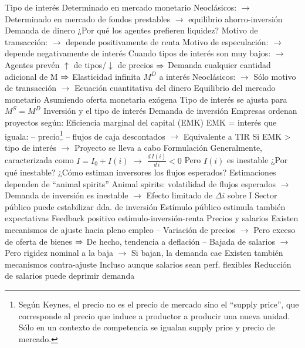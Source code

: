 \documentclass{nuevotema}
\begin{document}
\begin{esquemal}
				\4 Tipo de interés
				\4[] Determinado en mercado monetario
				\4[] Neoclásicos:
				\4[] $\to$ Determinado en mercado de fondos prestables
				\4[] $\to$ equilibrio ahorro-inversión
				\4 Demanda de dinero
				\4[] ¿Por qué los agentes prefieren liquidez?
				\4[] Motivo de transacción:
				\4[] $\to$ depende positivamente de renta
				\4[] Motivo de especulación:
				\4[] $\to$ depende negativamente de interés
				\4[] Cuando tipos de interés son muy bajos:
				\4[] $\to$ Agentes prevén $\uparrow$ de tipos/$\downarrow$ de precios
				\4[] $\then$ Demanda cualquier cantidad adicional de M
				\4[] $\then$ Elasticidad infinita $M^D$ a interés
				\4[] Neoclásicos:
				\4[] $\to$ Sólo motivo de transacción
				\4[] $\to$ Ecuación cuantitativa del dinero
				\4 Equilibrio del mercado monetario
				\4[] Asumiendo oferta monetaria exógena
				\4[] Tipo de interés se ajusta para $M^S = M^D$
			\3 Inversión y el tipo de interés
				\4 Demanda de inversión
				\4[] Empresas ordenan proyectos según:
				\4[] Eficiencia marginal del capital (EMK)
				\4[] EMK = interés que iguala:
				\4[] -- precio\footnote{Según Keynes, el precio no es el precio de mercado sino el ``supply price'', que corresponde al precio que induce a productor a producir una nueva unidad. Sólo en un contexto de competencia se igualan supply price y precio de mercado.}
				\4[] -- flujos de caja descontados
				\4[] $\to$ Equivalente a TIR
				\4[] Si EMK > tipo de interés
				\4[] $\to$ Proyecto se lleva a cabo
				\4 Formulación
				\4[] Generalmente, caracterizada como $I = I_0 + I(i)$
				\4[] $\to$ $\frac{d \, I(i)}{d \, i} < 0$
				\4[] Pero $I(i)$ es inestable
				\4 ¿Por qué inestable?
				\4[] ¿Cómo estiman inversores los flujos esperados?
				\4[] Estimaciones dependen de ``animal spirits''
				\4[] Animal spirits: volatilidad de flujos esperados
				\4[] $\to$ Demanda de inversión es inestable
				\4[] $\to$ Efecto limitado de $\Delta i$ sobre I
				\4[$\then$] Sector público puede estabilizar dda. de inversión
				\4[$\then$] Estímulo público estimula también expectativas
				\4[$\then$] Feedback positivo estímulo-inversión-renta
			\3 Precios y salarios
				\4 Existen mecanismos de ajuste hacia pleno empleo
				\4[] -- Variación de precios
				\4[] $\to$ Pero exceso de oferta de bienes
				\4[] $\then$ De hecho, tendencia a deflación
				\4[] -- Bajada de salarios
				\4[] $\to$ Pero rigidez nominal a la baja
				\4[] $\to$ Si bajan, la demanda cae
				\4 Existen también mecanismos contra-ajuste
				\4[] Incluso aunque salarios sean perf. flexibles
				\4[] Reducción de salarios puede deprimir demanda

\end{esquemal}
\end{document}
